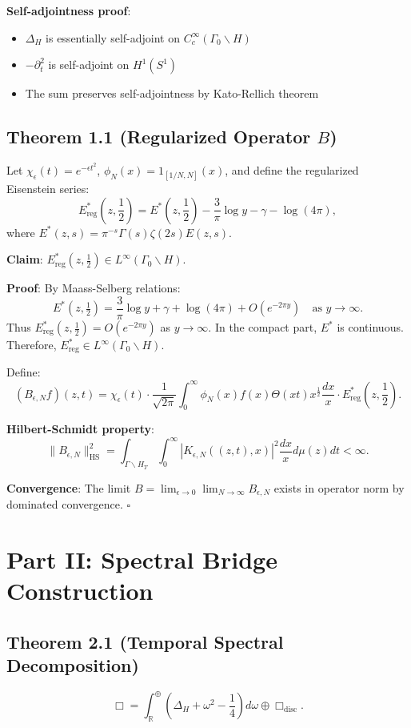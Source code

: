 \documentclass{article}
\begin{document}
\textbf{Self-adjointness proof}: 
\begin{itemize}
    \item \( \Delta_H \) is essentially self-adjoint on \( C_c^\infty(\Gamma_0 \backslash H) \)
    \item \( -\partial_t^2 \) is self-adjoint on \( H^1(S^1) \)
    \item The sum preserves self-adjointness by Kato-Rellich theorem
\end{itemize}

\subsection{Theorem 1.1 (Regularized Operator \( B \))}
Let \( \chi_\epsilon(t) = e^{-\epsilon t^2} \), \( \phi_N(x) = 1_{[1/N, N]}(x) \), and define the regularized Eisenstein series:
\[
E^*_{\text{reg}}\left(z, \frac{1}{2}\right) = E^*\left(z, \frac{1}{2}\right) - \frac{3}{\pi} \log y - \gamma - \log(4\pi),
\]
where \( E^*(z,s) = \pi^{-s} \Gamma(s) \zeta(2s) E(z,s) \). 

\textbf{Claim}: \( E^*_{\text{reg}}(z, \frac{1}{2}) \in L^\infty(\Gamma_0 \backslash H) \).

\textbf{Proof}: By Maass-Selberg relations:
\[
E^*(z, \tfrac{1}{2}) = \frac{3}{\pi} \log y + \gamma + \log(4\pi) + O(e^{-2\pi y}) \quad \text{as } y \to \infty.
\]
Thus \( E^*_{\text{reg}}(z, \tfrac{1}{2}) = O(e^{-2\pi y}) \) as \( y \to \infty \). In the compact part, \( E^* \) is continuous. Therefore, \( E^*_{\text{reg}} \in L^\infty(\Gamma_0 \backslash H) \).

Define:
\[
(B_{\epsilon,N} f)(z,t) = \chi_\epsilon(t) \cdot \frac{1}{\sqrt{2\pi}} \int_0^\infty \phi_N(x) f(x) \Theta(xt) x^{\frac{1}{2}} \frac{dx}{x} \cdot E^*_{\text{reg}}\left(z, \frac{1}{2}\right).
\]

\textbf{Hilbert-Schmidt property}:
\[
\|B_{\epsilon,N}\|_{\text{HS}}^2 = \int_{\Gamma \backslash H_T} \int_0^\infty |K_{\epsilon,N}((z,t), x)|^2 \frac{dx}{x} d\mu(z) dt < \infty.
\]

\textbf{Convergence}: The limit \( B = \lim_{\epsilon \to 0} \lim_{N \to \infty} B_{\epsilon,N} \) exists in operator norm by dominated convergence. \hfill \( \square \)

\section{Part II: Spectral Bridge Construction}

\subsection{Theorem 2.1 (Temporal Spectral Decomposition)}
\[
\Box = \int_{\mathbb{R}}^\oplus \left( \Delta_H + \omega^2 - \frac{1}{4} \right) d\omega \oplus \Box_{\text{disc}}.
\]
\end{document}
